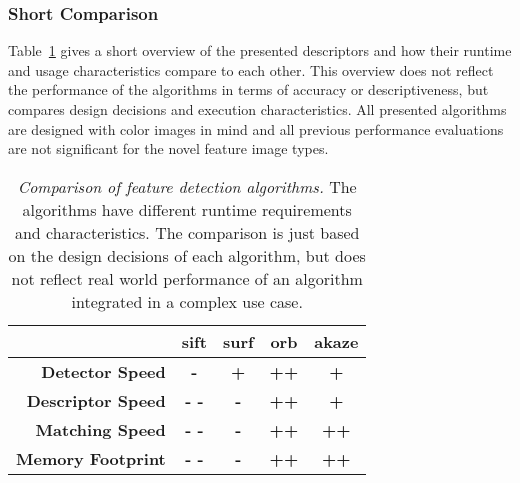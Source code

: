 \subsubsection{Short Comparison}

Table~\ref{tab:detector_comparison} gives a short overview of the presented descriptors and how their runtime and usage characteristics compare to each other.
This overview does not reflect the performance of the algorithms in terms of accuracy or descriptiveness, but compares design decisions and execution characteristics.
All presented algorithms are designed with color images in mind and all previous performance evaluations are not significant for the novel feature image types.
\begin{table}[H]
    {\renewcommand{\arraystretch}{1.3}%
    \setlength{\tabcolsep}{1em}%
    \footnotesize
    \begin{tabular}{rcccc}
    \toprule
    \null & \textbf{\acrshort{sift}} & \textbf{\acrshort{surf}} & \textbf{\acrshort{orb}} & \textbf{\acrshort{akaze}} \\
    \midrule
    \textbf{Detector Speed} & \textbf{-} & \textbf{+} & \textbf{++} & \textbf{+} \\
    \textbf{Descriptor Speed} & \textbf{- -} & \textbf{-} & \textbf{++} & \textbf{+} \\
    \textbf{Matching Speed} & \textbf{- -} & \textbf{-} & \textbf{++} & \textbf{++} \\
    \textbf{Memory Footprint} & \textbf{- -} & \textbf{-} & \textbf{++} & \textbf{++} \\
    \bottomrule
    \end{tabular}
    }
    \caption[Comparison of feature detection algorithms]{\emph{Comparison of feature detection algorithms.} The algorithms have different runtime requirements and characteristics. The comparison is just based on the design decisions of each algorithm, but does not reflect real world performance of an algorithm integrated in a complex use case.}\label{tab:detector_comparison}
\end{table}
